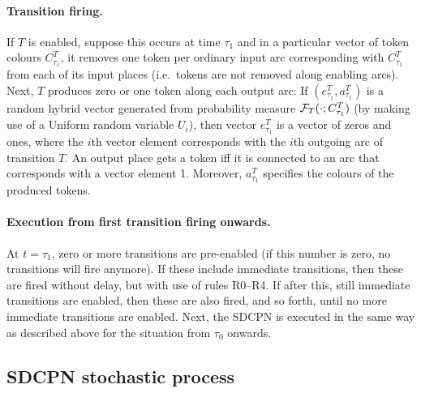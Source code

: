 \documentclass[copyright,creativecommons]{eptcs}
\begin{document}
\paragraph{Transition firing.}
If $T$ is enabled, suppose this occurs at time $\tau_1$
and in a particular vector of token colours
$C_{\tau_1}^T$, it removes one token per ordinary input arc corresponding
with $C_{\tau_1}^T$ from each
of its input places (i.e.\ tokens are not removed along enabling arcs).
Next, $T$ produces zero or one token along each output arc: If
$(e_{\tau_1}^T,a_{\tau_1}^T)$ is a random hybrid
vector generated from probability measure ${\cal F}_T(\cdot; C_{\tau_1}^T)$
(by making use of a Uniform random variable $U_i$), then
vector $e_{\tau_1}^T$ is a vector of zeros and ones, where
the $i$th vector element corresponds with the $i$th outgoing
arc of transition $T$. An output place gets a token iff it is
connected to an arc that corresponds with a vector element 1.
Moreover, $a_{\tau_1}^T$ specifies the
colours of the produced tokens.

\paragraph{Execution from first transition firing onwards.}
At $t=\tau_1$, zero or more transitions are pre-enabled (if this
number is zero, no transitions will fire anymore). If these
include immediate transitions, then these are fired without delay,
but with use of rules R0--R4. If after this, still immediate
transitions are enabled, then these are also fired, and so forth,
until no more immediate transitions are enabled.
Next, the SDCPN is executed in the same way as described above for
the situation from $\tau_0$ onwards.


\subsection{SDCPN stochastic process}
\label{subsec:SDCPN process}
\end{document}
